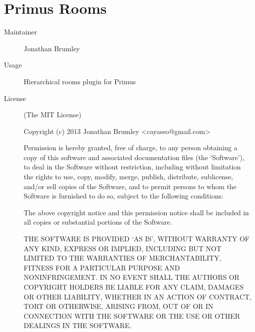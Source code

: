   \section*{Primus Rooms}
    \begin{description}
      \item[Maintainer] Jonathan Brumley
      \item[Usage] Hierarchical rooms plugin for Primus
      \item[License] \scriptsize (The MIT License)

        Copyright (c) 2013 Jonathan Brumley <cayasso@gmail.com>

        Permission is hereby granted, free of charge, to any person obtaining a copy of this software and associated documentation files (the `Software'), to deal in the Software without restriction, including without limitation the rights to use, copy, modify, merge, publish, distribute, sublicense, and/or sell copies of the Software, and to permit persons to whom the Software is furnished to do so, subject to the following conditions:

        The above copyright notice and this permission notice shall be included in all copies or substantial portions of the Software.

        THE SOFTWARE IS PROVIDED `AS IS', WITHOUT WARRANTY OF ANY KIND, EXPRESS OR IMPLIED, INCLUDING BUT NOT LIMITED TO THE WARRANTIES OF MERCHANTABILITY, FITNESS FOR A PARTICULAR PURPOSE AND NONINFRINGEMENT. IN NO EVENT SHALL THE AUTHORS OR COPYRIGHT HOLDERS BE LIABLE FOR ANY CLAIM, DAMAGES OR OTHER LIABILITY, WHETHER IN AN ACTION OF CONTRACT, TORT OR OTHERWISE, ARISING FROM, OUT OF OR IN CONNECTION WITH THE SOFTWARE OR THE USE OR OTHER DEALINGS IN THE SOFTWARE.
    \end{description}

